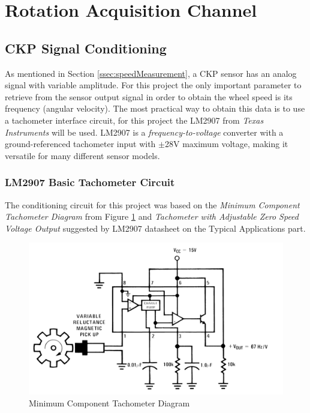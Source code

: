 \section{Rotation Acquisition Channel}\label{sec:speed-acquisition-channel}

	\subsection{CKP Signal Conditioning}\label{ssec:ckp-signal-conditioning-circuit}

		As mentioned in Section \ref{ssec:speedMeasurement}, a CKP sensor has an analog signal with variable amplitude. For this project the only important parameter to retrieve from the sensor output signal in order to obtain the wheel speed is its frequency (angular velocity). The most practical way to obtain this data is to use a tachometer interface circuit, for this project the LM2907 from \textit{Texas Instruments} \cite{lm2907-datasheet} will be used. LM2907 is a \textit{frequency-to-voltage} converter with a ground-referenced tachometer input with $\pm$28V maximum voltage, making it versatile for many different sensor models.
		
		\subsubsection{LM2907 Basic Tachometer Circuit}\label{sssec:lm2907-basic-tachometer-circuit}
			The conditioning circuit for this project was based on the \textit{Minimum Component Tachometer Diagram } from Figure \ref{fig:lm2907-minimum-component-tachometer-diagram} and \textit{Tachometer with Adjustable Zero Speed Voltage Output} suggested by LM2907 datasheet  \cite{lm2907-datasheet} on the Typical Applications part.

			\begin{figure}[htbp]
				\centering
				\includegraphics[width=.8\textwidth]{figuras/fig-lm2907-minimum-component-tachometer-diagram}
				\caption{Minimum Component Tachometer Diagram \cite{lm2907-datasheet}}
				\label{fig:lm2907-minimum-component-tachometer-diagram}
			\end{figure}

